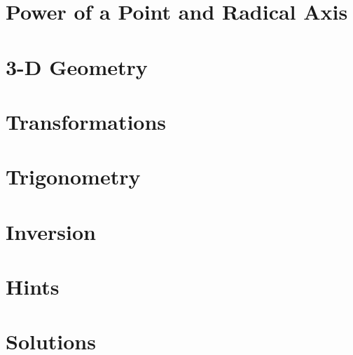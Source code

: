 \documentclass[11pt, twoside]{scrbook}
\begin{document}
\chapter{Power of a Point and Radical Axis}
	


\chapter{3-D Geometry}
	


\chapter{Transformations}
	


\chapter{Trigonometry}
	



\chapter{Inversion}
	


\clearpage
\chapter{Hints}
\makehints
\chapter{Solutions}
\makesoln

\end{document}
